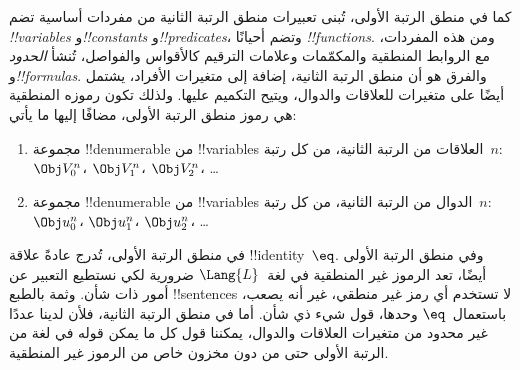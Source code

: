 \documentclass[../../../include/open-logic-section]{subfiles}
\begin{document}


كما في منطق الرتبة الأولى، تُبنى تعبيرات منطق الرتبة الثانية
من مفردات أساسية تضم \emph{!!{variable}s} و\emph{!!{constant}s}
و\emph{!!{predicate}s}، وتضم أحيانًا \emph{!!{function}s}. ومن هذه المفردات،
مع الروابط المنطقية والمكمّمات وعلامات الترقيم كالأقواس والفواصل،
تُنشأ \emph{الحدود} و\emph{!!{formula}s}. والفرق هو أن منطق الرتبة الثانية،
إضافة إلى متغيرات الأفراد، يشتمل أيضًا على متغيرات للعلاقات والدوال،
ويتيح التكميم عليها. ولذلك تكون رموزه المنطقية هي رموز منطق الرتبة
الأولى، مضافًا إليها ما يأتي:

\begin{enumerate}
\item مجموعة !!{denumerable} من !!{variable}s العلاقات من الرتبة الثانية،
  من كل رتبة~$n$: $\Obj V_0^n$، $\Obj V_1^n$، $\Obj V_2^n$، \dots
\item مجموعة !!{denumerable} من !!{variable}s الدوال من الرتبة الثانية،
  من كل رتبة~$n$: $\Obj u_0^n$، $\Obj u_1^n$، $\Obj u_2^n$، \dots
\end{enumerate}

في منطق الرتبة الأولى، تُدرج عادةً علاقة !!{identity}~$\eq$. وفي منطق
الرتبة الأولى أيضًا، تعد الرموز غير المنطقية في لغة~$\Lang{L}$
ضرورية لكي نستطيع التعبير عن أمور ذات شأن. وثمة بالطبع !!{sentence}s
لا تستخدم أي رمز غير منطقي، غير أنه يصعب، باستعمال~$\eq$ وحدها، قول
شيء ذي شأن. أما في منطق الرتبة الثانية، فلأن لدينا عددًا غير محدود
من متغيرات العلاقات والدوال، يمكننا قول كل ما يمكن قوله في لغة من
الرتبة الأولى حتى من دون مخزون خاص من الرموز غير المنطقية.
\end{document}
